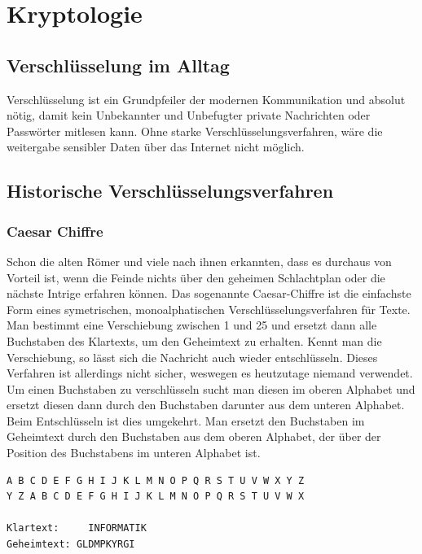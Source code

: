\section{Kryptologie}
\subsection{Verschlüsselung im Alltag}

Verschlüsselung ist ein Grundpfeiler der modernen Kommunikation und absolut nötig,
damit kein Unbekannter und Unbefugter private Nachrichten oder Passwörter mitlesen
kann. Ohne starke Verschlüsselungsverfahren, wäre die weitergabe sensibler Daten über
das Internet nicht möglich.

\subsection{Historische Verschlüsselungsverfahren}

\subsubsection{Caesar Chiffre}

Schon die alten Römer und viele nach ihnen erkannten, dass es durchaus von Vorteil
ist, wenn die Feinde nichts über den geheimen Schlachtplan oder die nächste Intrige
erfahren können.
Das sogenannte Caesar-Chiffre ist die einfachste Form eines symetrischen,
monoalphatischen Verschlüsselungsverfahren für Texte.
Man bestimmt eine Verschiebung zwischen 1 und 25 und ersetzt dann
alle Buchstaben des Klartexts, um den Geheimtext zu erhalten.
Kennt man die Verschiebung, so lässt sich die Nachricht auch wieder entschlüsseln.
Dieses Verfahren ist allerdings nicht sicher, weswegen es heutzutage niemand verwendet.
Um einen Buchstaben zu verschlüsseln sucht man diesen im oberen Alphabet und
ersetzt diesen dann durch den Buchstaben darunter aus dem unteren Alphabet.
Beim Entschlüsseln ist dies umgekehrt. Man ersetzt den Buchstaben im Geheimtext
durch den Buchstaben aus dem oberen Alphabet, der über der Position des Buchstabens
im unteren Alphabet ist.

\begin{lstlisting}
A B C D E F G H I J K L M N O P Q R S T U V W X Y Z
Y Z A B C D E F G H I J K L M N O P Q R S T U V W X

Klartext:     INFORMATIK
Geheimtext: GLDMPKYRGI
\end{lstlisting}

\clearpage

